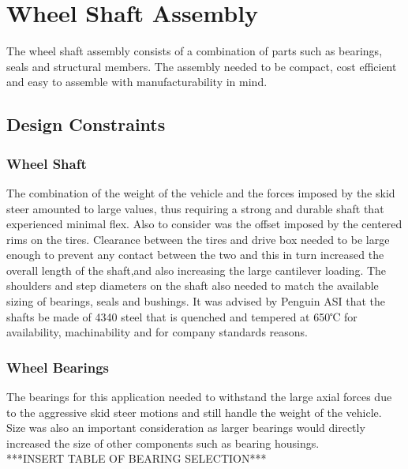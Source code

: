 \section{Wheel Shaft Assembly}
The wheel shaft assembly consists of a combination of parts such as bearings, seals and structural members. The assembly needed to be compact, cost efficient and easy to assemble with manufacturability in mind. %

\subsection{Design Constraints}
\subsubsection{Wheel Shaft}
The combination of the weight of the vehicle and the forces imposed by the skid steer amounted to large values, thus requiring a strong and durable shaft that experienced minimal flex. Also to consider was the offset imposed by the centered rims on the tires. Clearance between the tires and drive box needed to be large enough to prevent any contact between the two and this in turn increased the overall length of the shaft,and also increasing the large cantilever loading. The shoulders and step diameters on the shaft also needed to match the available sizing of bearings, seals and bushings. It was advised by Penguin ASI that the shafts be made of 4340 steel that is quenched and tempered at 650℃ for availability, machinability and for company standards reasons.

\subsubsection{Wheel Bearings}
The bearings for this application needed to withstand the large axial forces due to the aggressive skid steer motions and still handle the weight of the vehicle. Size was also an important consideration as larger bearings would directly increased the size of other components such as bearing housings.
\\
***INSERT TABLE OF BEARING SELECTION***
\\

